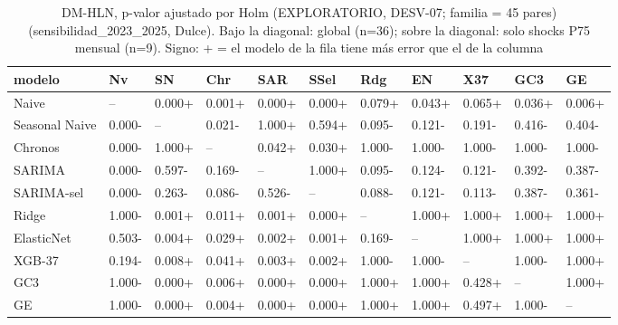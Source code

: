\begin{table}[H]
\centering
\small
\caption{DM-HLN, p-valor ajustado por Holm (EXPLORATORIO, DESV-07; familia = 45 pares) (sensibilidad\_2023\_2025, Dulce). Bajo la diagonal: global (n=36); sobre la diagonal: solo shocks P75 mensual (n=9). Signo: + = el modelo de la fila tiene más error que el de la columna}
\label{tab:T09_DM_holm_matriz_sensibilidad_2023_2025_dulce}
\begin{tabular}{lllllllllll}
\toprule
modelo & Nv & SN & Chr & SAR & SSel & Rdg & EN & X37 & GC3 & GE \\
\midrule
Naive & -- & 0.000+ & 0.001+ & 0.000+ & 0.000+ & 0.079+ & 0.043+ & 0.065+ & 0.036+ & 0.006+ \\
Seasonal Naive & 0.000- & -- & 0.021- & 1.000+ & 0.594+ & 0.095- & 0.121- & 0.191- & 0.416- & 0.404- \\
Chronos & 0.000- & 1.000+ & -- & 0.042+ & 0.030+ & 1.000- & 1.000- & 1.000- & 1.000- & 1.000- \\
SARIMA & 0.000- & 0.597- & 0.169- & -- & 1.000+ & 0.095- & 0.124- & 0.121- & 0.392- & 0.387- \\
SARIMA-sel & 0.000- & 0.263- & 0.086- & 0.526- & -- & 0.088- & 0.121- & 0.113- & 0.387- & 0.361- \\
Ridge & 1.000- & 0.001+ & 0.011+ & 0.001+ & 0.000+ & -- & 1.000+ & 1.000+ & 1.000+ & 1.000+ \\
ElasticNet & 0.503- & 0.004+ & 0.029+ & 0.002+ & 0.001+ & 0.169- & -- & 1.000+ & 1.000+ & 1.000+ \\
XGB-37 & 0.194- & 0.008+ & 0.041+ & 0.003+ & 0.002+ & 1.000- & 1.000- & -- & 1.000- & 1.000+ \\
GC3 & 1.000- & 0.000+ & 0.006+ & 0.000+ & 0.000+ & 1.000+ & 1.000+ & 0.428+ & -- & 1.000+ \\
GE & 1.000- & 0.000+ & 0.004+ & 0.000+ & 0.000+ & 1.000+ & 1.000+ & 0.497+ & 1.000- & -- \\
\bottomrule
\end{tabular}
\end{table}